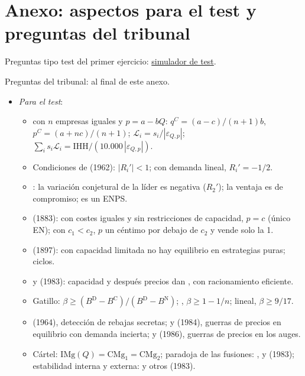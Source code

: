 \documentclass[11pt]{article}
\begin{document}
\section{Anexo: aspectos para el test y preguntas del tribunal}\label{anexo:test}

\begin{anotaciones}
Preguntas tipo test del primer ejercicio: \href{https://www.victorgutierrezmarcos.es/oposicion/temario/primer-ejercicio/test/simulador.html?tema=3.A.19}{simulador de test}.

Preguntas del tribunal: al final de este anexo.
\end{anotaciones}

\begin{itemize}
\item \emph{Para el test}:
  \begin{itemize}
  \item {} con $n$ empresas iguales y $p=a-bQ$: $q^C=(a-c)/(n+1)b$, $p^C=(a+nc)/(n+1)$; $\mathcal{L}_i=s_i/|\varepsilon_{Q,p}|$; $\sum_is_i\mathcal{L}_i=\mathrm{IHH}/(10.000\,|\varepsilon_{Q,p}|)$.
  \item Condiciones de  (1962): $|R_i'|<1$; con demanda lineal, $R_i'=-1/2$.
  \item {}: la variación conjetural de la líder es negativa ($R_2'$); la ventaja es de compromiso; es un ENPS.
  \item {} (1883): con costes iguales y sin restricciones de capacidad, $p=c$ (único EN); con $c_1<c_2$, $p$ un céntimo por debajo de $c_2$ y vende solo la 1.
  \item {} (1897): con capacidad limitada no hay equilibrio en estrategias puras; ciclos.
  \item {} y  (1983): capacidad y después precios dan , con racionamiento eficiente.
  \item Gatillo: $\beta\geq(B^{\mathrm D}-B^{\mathrm C})/(B^{\mathrm D}-B^{\mathrm N})$; , $\beta\geq1-1/n$;  lineal, $\beta\geq9/17$.
  \item {} (1964), detección de rebajas secretas;  y  (1984), guerras de precios en equilibrio con demanda incierta;  y  (1986), guerras de precios en los auges.
  \item Cártel: $\mathrm{IMg}(Q)=\mathrm{CMg}_1=\mathrm{CMg}_2$; paradoja de las fusiones: ,  y  (1983); estabilidad interna y externa:  y otros (1983).

\end{itemize}
\end{itemize}
\end{document}
